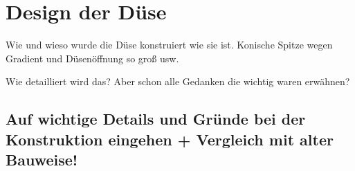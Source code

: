 \chapter{Design der Düse} 

Wie und wieso wurde die Düse konstruiert wie sie ist. Konische Spitze wegen Gradient und Düsenöffnung so groß usw.

Wie detailliert wird das? Aber schon alle Gedanken die wichtig waren erwähnen?

\section{Auf wichtige Details und Gründe bei der Konstruktion eingehen + Vergleich mit alter Bauweise!}